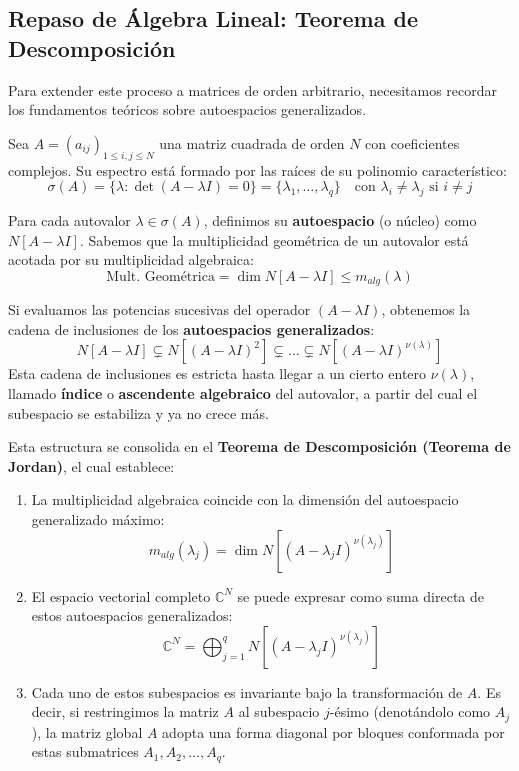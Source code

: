 \subsection{Repaso de Álgebra Lineal: Teorema de Descomposición}

Para extender este proceso a matrices de orden arbitrario, necesitamos recordar los fundamentos teóricos sobre autoespacios generalizados.

Sea $A = (a_{ij})_{1 \le i,j \le N}$ una matriz cuadrada de orden $N$ con coeficientes complejos. Su espectro está formado por las raíces de su polinomio característico:
\[
    \sigma(A) = \{ \lambda : \det(A - \lambda I) = 0 \} = \{\lambda_1, \dots, \lambda_q\} \quad \text{con } \lambda_i \neq \lambda_j \text{ si } i \neq j
\]

Para cada autovalor $\lambda \in \sigma(A)$, definimos su \textbf{autoespacio} (o núcleo) como $N[A-\lambda I]$. Sabemos que la multiplicidad geométrica de un autovalor está acotada por su multiplicidad algebraica:
\[
    \text{Mult. Geométrica} = \dim N[A-\lambda I] \leq m_{alg}(\lambda)
\]

Si evaluamos las potencias sucesivas del operador $(A-\lambda I)$, obtenemos la cadena de inclusiones de los \textbf{autoespacios generalizados}:
\[
    N[A-\lambda I] \subsetneq N[(A-\lambda I)^2] \subsetneq \dots \subsetneq N[(A-\lambda I)^{\nu(\lambda)}]
\]
Esta cadena de inclusiones es estricta hasta llegar a un cierto entero $\nu(\lambda)$, llamado \textbf{índice} o \textbf{ascendente algebraico} del autovalor, a partir del cual el subespacio se estabiliza y ya no crece más.

Esta estructura se consolida en el \textbf{Teorema de Descomposición (Teorema de Jordan)}, el cual establece:
\begin{enumerate}
    \item La multiplicidad algebraica coincide con la dimensión del autoespacio generalizado máximo:
    \[
        m_{alg}(\lambda_j) = \dim N[(A-\lambda_j I)^{\nu(\lambda_j)}]
    \]
    
    \item El espacio vectorial completo $\mathbb{C}^N$ se puede expresar como suma directa de estos autoespacios generalizados:
    \[
        \mathbb{C}^N = \bigoplus_{j=1}^q N[(A-\lambda_j I)^{\nu(\lambda_j)}]
    \]
    
    \item Cada uno de estos subespacios es invariante bajo la transformación de $A$. Es decir, si restringimos la matriz $A$ al subespacio $j$-ésimo (denotándolo como $A_j$), la matriz global $A$ adopta una forma diagonal por bloques conformada por estas submatrices $A_1, A_2, \dots, A_q$.
\end{enumerate}
